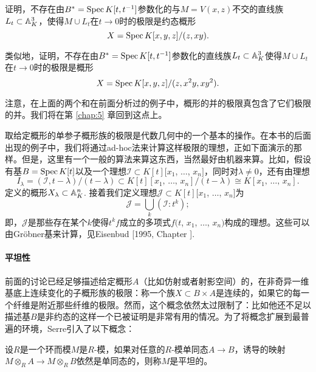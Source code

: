 \begin{exe}
\begin{compactenum}[(a)]
\item 证明，不存在由$B^*=\operatorname{Spec} K[t,t^{-1}]$参数化的与$M=V(x,z)$不交的直线族$L_t\subset \mathbb{A}_K^3$，使得$M\cup L_t$在$t\to 0$时的极限是约态概形
\[
	X=\operatorname{Spec} K[x,y,z]/(z,xy).
\]

\item 类似地，证明，不存在由$B^*=\operatorname{Spec} K[t,t^{-1}]$参数化的直线族$L_t\subset \mathbb{A}_K^3$使得$M\cup L_t$在$t\to 0$时的极限是概形
\[
	X=\operatorname{Spec} K[x,y,z]/(z,x^2y,xy^2).
\]
\end{compactenum}

注意，在上面的两个和在前面分析过的例子中，概形的并的极限真包含了它们极限的并。我们将在第 \ref{chap:5} 章回到这点上。
\end{exe}

取给定概形的单参子概形族的极限是代数几何中的一个基本的操作。在本书的后面出现的例子中，我们将通过ad-hoc\nottran 法来计算这样极限的理想，正如下面演示的那样。但是，这里有一个一般的算法来算这东西，当然最好由机器来算。比如，假设有基$B=\operatorname{Spec} K[t]$以及一个理想$\mathscr{I}\subset K[t][x_1$, $\dots$, $x_n]$，同时对$\lambda \neq 0$，还有由理想
\[
	I_\lambda=(\mathscr{I},t-\lambda)/(t-\lambda)\subset K[t][\text{$x_1$, $\dots$, $x_n$}]/(t-\lambda)\cong K[\text{$x_1$, $\dots$, $x_n$}].
\]
定义的概形$X_\lambda\subset \mathbb{A}_K^n$. 接着我们定义理想$\mathscr{J}\subset K[t][x_1$, $\dots$, $x_n]$为
\[
	\mathscr{J}=\bigcup_k (\mathscr{I}:t^k);
\]
即，$\mathscr{J}$是那些存在某个$k$使得$t^k f$成立的多项式$f(t$, $x_1$, $\dots$, $x_n)$构成的理想。这些可以由Gr\"{o}bner基来计算，见Eisenbud [1995, Chapter \uppercase\expandafter{}].

\paragraph*{平坦性}
前面的讨论已经足够描述给定概形$A$（比如仿射或者射影空间）的，在非奇异一维基底上连续变化的子概形族的极限：称一个族$X\subset B\times A$是连续的，如果它的每一个纤维是附近那些纤维的极限。然而，这个概念依然太过限制了：比如他还不足以描述基$B$是非约态的这样一个已被证明是非常有用的情况。为了将概念扩展到最普遍的环境，Serre引入了以下概念：

\begin{defi}
	设$R$是一个环而模$M$是$R$\hyp 模，如果对任意的$R$\hyp 模单同态$A\to B$，诱导的映射$M\otimes_R A\to M\otimes_R B$依然是单同态的，则称$M$是平坦的。
\end{defi}

